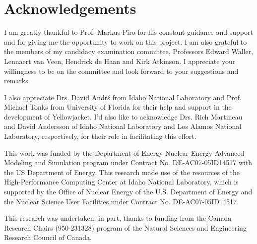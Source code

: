 \chapter*{Acknowledgements}
\label{acknowledgements}

I am greatly thankful to Prof. Markus Piro for his constant guidance and support and for giving me the opportunity to work on this project. I am also grateful to the members of my candidacy examination committee, Professors Edward Waller, Lennaert van Veen, Hendrick de Haan and Kirk Atkinson. I appreciate your willingness to be on the committee and look forward to your suggestions and remarks.

I also appreciate Drs. David Andr\v{s} from Idaho National Laboratory and Prof. Michael Tonks from University of Florida for their help and support in the development of Yellowjacket. I'd also like to acknowledge Drs. Rich Martineau and David Andersson of Idaho National Laboratory and Los Alamos National Laboratory, respectively, for their role in facilitating this effort.

This work was funded by the Department of Energy Nuclear Energy Advanced Modeling and Simulation program under Contract No. DE-AC07-05ID14517 with the US Department of Energy. This research made use of the resources of the High-Performance Computing Center at Idaho National Laboratory, which is supported by the Office of Nuclear Energy of the U.S. Department of Energy and the Nuclear Science User Facilities under Contract No. DE-AC07-05ID14517. 

This research was undertaken, in part, thanks to funding from the Canada Research Chairs (950-231328) program of the Natural Sciences and Engineering Research Council of Canada.

